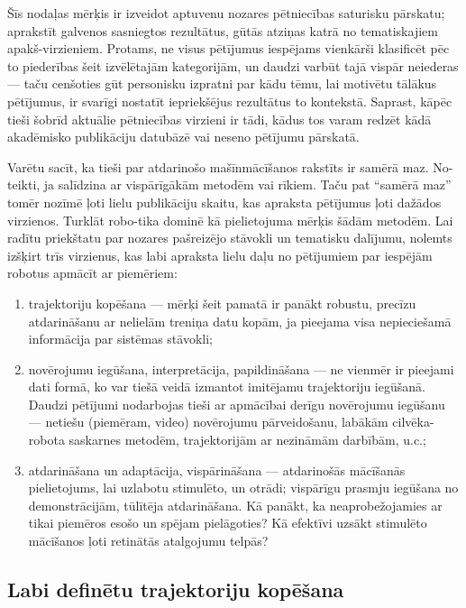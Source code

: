\documentclass[12pt, a4paper]{article}
\numberwithin{equation}{section} %
\begin{document}
Šīs nodaļas mērķis ir izveidot aptuvenu nozares pētniecības saturisku pārskatu; aprakstīt galvenos sasniegtos rezultātus, gūtās atziņas katrā no tematiskajiem apakš-virzieniem. Protams, ne visus pētījumus iespējams vienkārši klasificēt pēc to piederības šeit izvēlētajām kategorijām, un daudzi varbūt tajā vispār neiederas --- taču cenšoties gūt personisku izpratni par kādu tēmu, lai motivētu tālākus pētījumus, ir svarīgi nostatīt iepriekšējus rezultātus to kontekstā. Saprast, kāpēc tieši šobrīd aktuālie pētniecības virzieni ir tādi, kādus tos varam redzēt kādā akadēmisko publikāciju datubāzē vai neseno pētījumu pārskatā.

Varētu sacīt, ka tieši par atdarinošo mašīnmācīšanos rakstīts ir samērā maz. No-teikti, ja salīdzina ar vispārīgākām metodēm vai rīkiem. Taču pat ``samērā maz'' tomēr nozīmē ļoti lielu publikāciju skaitu, kas apraksta pētījumus ļoti dažādos virzienos. Turklāt robo-tika dominē kā pielietojuma mērķis šādām metodēm. Lai radītu priekštatu par nozares pašreizējo stāvokli un tematisku dalījumu, nolemts izšķirt trīs virzienus, kas labi apraksta lielu daļu no pētījumiem par iespējām robotus apmācīt ar piemēriem:

\begin{enumerate}
    \item trajektoriju kopēšana --- mērķi šeit pamatā ir panākt robustu, precīzu atdarināšanu ar nelielām treniņa datu kopām, ja pieejama visa nepieciešamā informācija par sistēmas stāvokli;
    \item novērojumu iegūšana, interpretācija, papildināšana --- ne vienmēr ir pieejami dati formā, ko var tiešā veidā izmantot imitējamu trajektoriju iegūšanā. Daudzi pētījumi nodarbojas tieši ar apmācībai derīgu novērojumu iegūšanu --- netiešu (piemēram, video) novērojumu pārveidošanu, labākām cilvēka-robota saskarnes metodēm, trajektorijām ar nezināmām darbībām, u.c.;
    \item atdarināšana un adaptācija, vispārināšana --- atdarinošās mācīšanās pielietojums, lai uzlabotu stimulēto, un otrādi; vispārīgu prasmju iegūšana no demonstrācijām, tūlītēja atdarināšana. Kā panākt, ka neaprobežojamies ar tikai piemēros esošo un spējam pielāgoties? Kā efektīvi uzsākt stimulēto mācīšanos ļoti retinātās atalgojumu telpās?
\end{enumerate}

\subsection{Labi definētu trajektoriju kopēšana}
\end{document}
